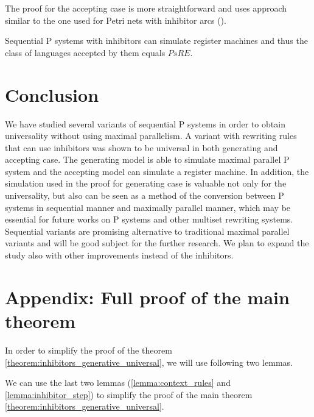 \documentclass[llncs,submission,copyright,creativecommons]{../lib/lncs/llncs}
\begin{document}
The proof for the accepting case is more straightforward and uses approach similar to the one used for Petri nets with inhibitor arcs (\cite{Agerwala74}).

\begin{theorem}
  Sequential P systems with inhibitors can simulate register machines and thus the class of languages accepted by them equals $PsRE$.
\end{theorem}




\section{Conclusion}
\label{sec:conclusion}
We have studied several variants of sequential P systems in order to obtain universality without using maximal parallelism.
A variant with rewriting rules that can use inhibitors was shown to be universal in both generating and accepting case. The generating model is able to simulate maximal parallel P system and the accepting model can simulate a register machine.
In addition, the simulation used in the proof for generating case is valuable not only for the universality, but also can be seen as a method of the conversion between P systems in sequential manner and maximally parallel manner, which may be essential for future works on P systems and other multiset rewriting systems.
Sequential variants are promising alternative to traditional maximal parallel variants and will be good subject for the further research. We plan to expand the study also with other improvements instead of the inhibitors.


\section{Appendix: Full proof of the main theorem} %
\label{sec:appendix}

In order to simplify the proof of the theorem \ref{theorem:inhibitors_generative_universal}, we will use following two lemmas.


We can use the last two lemmas (\ref{lemma:context_rules} and \ref{lemma:inhibitor_step}) to simplify the proof of the main theorem \ref{theorem:inhibitors_generative_universal}.


\end{document}
